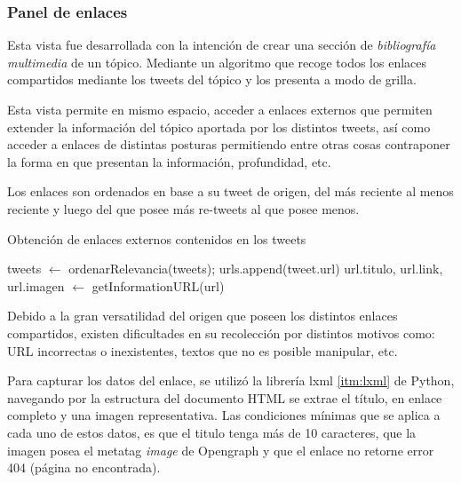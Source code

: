 \subsubsection{Panel de enlaces}

Esta vista fue desarrollada con la intención de crear una sección de \emph{bibliografía multimedia} de un tópico. Mediante un algoritmo que recoge todos los enlaces compartidos mediante los tweets del tópico y los presenta a modo
de grilla.

Esta vista permite en mismo espacio, acceder a enlaces externos que permiten extender la información del tópico aportada por los distintos tweets, así como acceder a enlaces de distintas posturas permitiendo entre otras cosas contraponer la forma en que presentan la información, profundidad, etc.

Los enlaces son ordenados en base a su tweet de origen, del más reciente al menos reciente y luego del que posee más re-tweets al que posee menos.

\begin{algorithm}
	\caption{Obtención de enlaces externos contenidos en los tweets}\label{getURLAlgo}
	\begin{algorithmic}[H]
		tweets $\gets$ ordenarRelevancia(tweets);
				\State urls.append(tweet.url)
			\EndIf
		\EndFor
			\State url.titulo, url.link, url.imagen $\gets$ getInformationURL(url)
		\EndFor 
		\EndFunction

	\end{algorithmic}
\end{algorithm}

Debido a la gran versatilidad del origen que poseen los distintos enlaces compartidos, existen dificultades en su recolección por distintos motivos como: URL incorrectas o inexistentes, textos que no es posible manipular, etc.

Para capturar los datos del enlace, se utilizó la librería lxml \ref{itm:lxml} de Python, navegando por la estructura del documento HTML se extrae el título, en enlace completo y una imagen representativa. Las condiciones mínimas que se aplica a cada uno de estos datos, es que el titulo tenga más de 10 caracteres, que la imagen posea el metatag \emph{image} de Opengraph \cite{openGraphProtocol} y que el enlace no retorne error 404 (página no encontrada).


	
	   